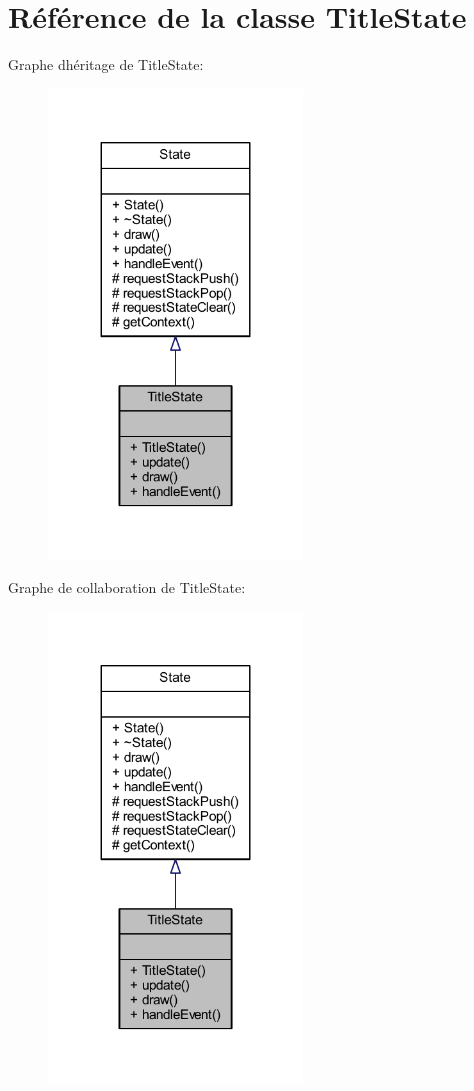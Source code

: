 \hypertarget{class_title_state}{}\section{Référence de la classe Title\+State}
\label{class_title_state}


Graphe d\textquotesingle{}héritage de Title\+State\+:\nopagebreak
\begin{figure}[H]
\begin{center}
\leavevmode
\includegraphics[width=191pt]{class_title_state__inherit__graph}
\end{center}
\end{figure}


Graphe de collaboration de Title\+State\+:\nopagebreak
\begin{figure}[H]
\begin{center}
\leavevmode
\includegraphics[width=191pt]{class_title_state__coll__graph}
\end{center}
\end{figure}

